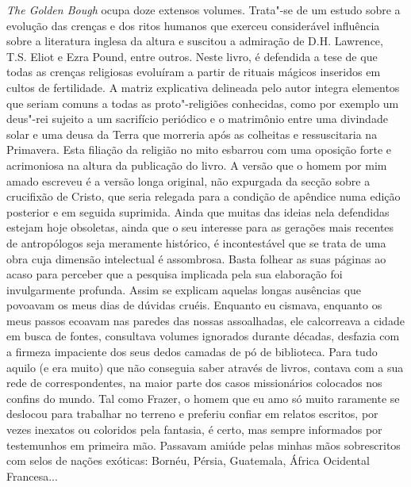 \emph{The Golden Bough }ocupa doze extensos volumes. Trata"-se de um
estudo sobre a evolução das crenças e dos ritos humanos que exerceu
considerável influência sobre a literatura inglesa da altura e suscitou
a admiração de D.H. Lawrence,
T.S. Eliot e Ezra Pound, entre outros. Neste livro, é defendida a tese
de que todas as crenças religiosas evoluíram a partir de rituais mágicos
inseridos em cultos de fertilidade. A matriz explicativa delineada pelo
autor integra elementos que seriam comuns a todas as proto"-religiões
conhecidas, como por exemplo um deus"-rei sujeito a um sacrifício
periódico e o matrimônio entre uma divindade solar e uma deusa da Terra
que morreria após as colheitas e ressuscitaria na Primavera. Esta
filiação da religião no mito esbarrou com uma oposição forte e
acrimoniosa na altura da publicação do livro. A versão que o homem por
mim amado escreveu é a versão longa original, não expurgada da secção
sobre a crucifixão de Cristo, que seria relegada para a condição de
apêndice numa edição posterior e em seguida suprimida. Ainda que muitas
das ideias nela defendidas estejam hoje obsoletas, ainda que o seu
interesse para as gerações mais recentes de antropólogos seja meramente
histórico, é incontestável que se trata de uma
obra cuja dimensão intelectual é assombrosa. Basta folhear as suas
páginas ao acaso para perceber que a pesquisa implicada pela sua
elaboração foi invulgarmente profunda. Assim se explicam aquelas
longas ausências que povoavam os meus dias de dúvidas cruéis. Enquanto
eu cismava, enquanto os meus passos ecoavam nas paredes das nossas
assoalhadas, ele calcorreava a cidade em busca de fontes, consultava
volumes ignorados durante décadas, desfazia com a firmeza impaciente dos
seus dedos camadas de pó de biblioteca. Para tudo aquilo (e era muito)
que não conseguia saber através de livros, contava com a sua rede de
correspondentes, na maior parte dos casos missionários colocados nos
confins do mundo. Tal como Frazer, o homem que eu amo só muito raramente
se deslocou para trabalhar no terreno e preferiu confiar em relatos
escritos, por vezes inexatos ou coloridos pela fantasia, é certo, mas
sempre informados por testemunhos em primeira mão. Passavam amiúde
pelas minhas mãos sobrescritos com selos de nações exóticas: Bornéu,
Pérsia, Guatemala, África Ocidental Francesa...

